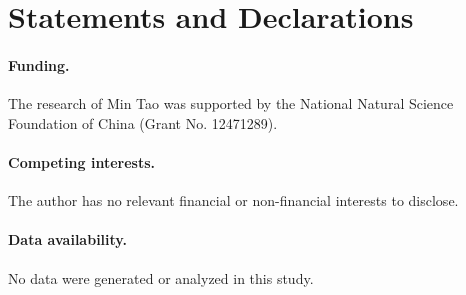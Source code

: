 \documentclass[11pt]{article}
\numberwithin{equation}{section}
\begin{document}


\section*{Statements and Declarations}

\paragraph{Funding.} The research of Min Tao was supported  by the National Natural Science Foundation of China (Grant No. 12471289).

\paragraph{Competing interests.}
The author has no relevant financial or non-financial interests to disclose.

\paragraph{Data availability.}
No data were generated or analyzed in this study.
\end{document}
